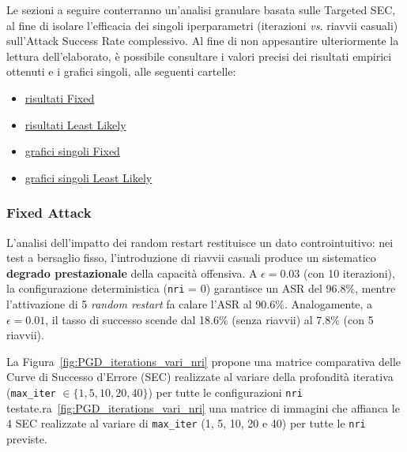 \documentclass[a4paper, 12pt]{article}
\begin{document}
Le sezioni a seguire conterranno un'analisi granulare basata sulle Targeted SEC, al fine di isolare l'efficacia dei singoli iperparametri (iterazioni \textit{vs.} riavvii casuali) sull'Attack Success Rate complessivo. Al fine di non appesantire ulteriormente la lettura dell'elaborato, è possibile consultare i valori precisi dei risultati empirici ottenuti e i grafici singoli, alle seguenti cartelle:
\begin{itemize}
    \item \href{https://github.com/ChristianRosa02/AI4Cybersecurity/blob/master/results/PGD_Targeted_Fixed/PGD_Targeted_Fixed_results.csv}{risultati Fixed}
    \item \href{https://github.com/ChristianRosa02/AI4Cybersecurity/blob/master/results/PGD_Targeted_LeastLikely/PGD_Targeted_LeastLikely_results.csv}{risultati Least Likely}
    \item \href{https://github.com/ChristianRosa02/AI4Cybersecurity/tree/master/results/PGD_Targeted_Fixed}{grafici singoli Fixed}
    \item \href{https://github.com/ChristianRosa02/AI4Cybersecurity/tree/master/results/PGD_Targeted_LeastLikely}{grafici singoli Least Likely}
\end{itemize}


\subsubsection*{Fixed Attack}
L'analisi dell'impatto dei random restart restituisce un dato controintuitivo: nei test a bersaglio fisso, l'introduzione di riavvii casuali produce un sistematico \textbf{degrado prestazionale} della capacità offensiva. A $\epsilon = 0.03$ (con 10 iterazioni), la configurazione deterministica (\texttt{nri} = 0) garantisce un ASR del 96.8\%, mentre l'attivazione di 5 \textit{random restart} fa calare l'ASR al 90.6\%. Analogamente, a $\epsilon = 0.01$, il tasso di successo scende dal 18.6\% (senza riavvii) al 7.8\% (con 5 riavvii). 

La Figura~\ref{fig:PGD_iterations_vari_nri} propone una matrice comparativa delle Curve di Successo d'Errore (SEC) realizzate al variare della profondità iterativa (\texttt{max\_iter} $\in \{1, 5, 10, 20, 40\}$) per tutte le configurazioni \texttt{nri} testate.ra~\ref{fig:PGD_iterations_vari_nri} una matrice di immagini che affianca le 4 SEC realizzate al variare di \texttt{max\_iter} (1, 5, 10, 20 e 40) per tutte le \texttt{nri} previste. 
\end{document}
